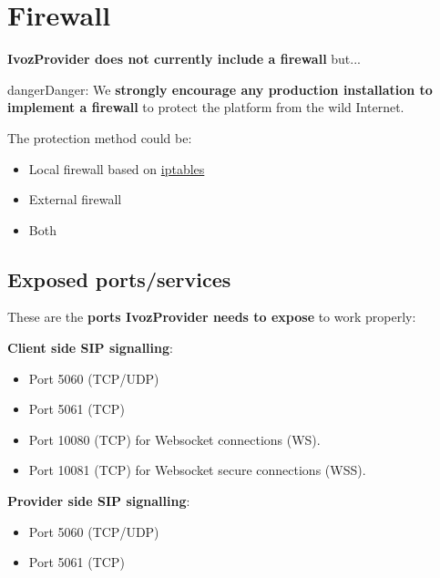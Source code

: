\documentclass[letterpaper,10pt,english]{sphinxmanual}
\begin{document}
\section{Firewall}
\label{security_and_maintenance/security/firewall:firewall}\label{security_and_maintenance/security/firewall::doc}
\textbf{IvozProvider does not currently include a firewall} but...

\begin{notice}{danger}{Danger:}
We \textbf{strongly encourage any production installation to implement
a firewall} to protect the platform from the wild Internet.
\end{notice}

The protection method could be:
\begin{itemize}
\item {} 
Local firewall based on \href{https://www.netfilter.org/}{iptables}

\item {} 
External firewall

\item {} 
Both

\end{itemize}


\subsection{Exposed ports/services}
\label{security_and_maintenance/security/firewall:exposed-ports-services}
These are the \textbf{ports IvozProvider needs to expose} to work properly:

\textbf{Client side SIP signalling}:
\begin{itemize}
\item {} 
Port 5060 (TCP/UDP)

\item {} 
Port 5061 (TCP)

\item {} 
Port 10080 (TCP) for Websocket connections (WS).

\item {} 
Port 10081 (TCP) for Websocket secure connections (WSS).

\end{itemize}

\textbf{Provider side SIP signalling}:
\begin{itemize}
\item {} 
Port 5060 (TCP/UDP)

\item {} 
Port 5061 (TCP)

\end{itemize}
\end{document}
